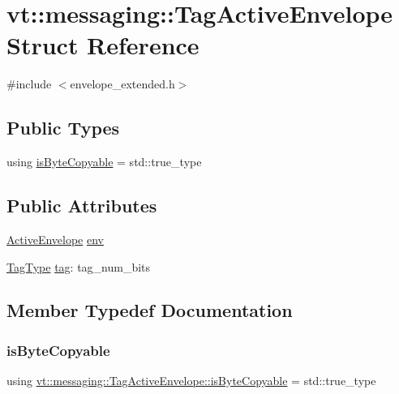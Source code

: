 \hypertarget{structvt_1_1messaging_1_1_tag_active_envelope}{}\section{vt\+:\+:messaging\+:\+:Tag\+Active\+Envelope Struct Reference}
\label{structvt_1_1messaging_1_1_tag_active_envelope}


{\ttfamily \#include $<$envelope\+\_\+extended.\+h$>$}

\subsection*{Public Types}
\begin{DoxyCompactItemize}
\item 
using \hyperlink{structvt_1_1messaging_1_1_tag_active_envelope_a25b95de57b90351e8b017ea2742eadc2}{is\+Byte\+Copyable} = std\+::true\+\_\+type
\end{DoxyCompactItemize}
\subsection*{Public Attributes}
\begin{DoxyCompactItemize}
\item 
\hyperlink{structvt_1_1messaging_1_1_active_envelope}{Active\+Envelope} \hyperlink{structvt_1_1messaging_1_1_tag_active_envelope_a407d7bb06664c813df052dac889f8f3a}{env}
\item 
\hyperlink{namespacevt_a84ab281dae04a52a4b243d6bf62d0e52}{Tag\+Type} \hyperlink{structvt_1_1messaging_1_1_tag_active_envelope_ab5fdfcb898f8e0ca0b5c580018824766}{tag}\+: tag\+\_\+num\+\_\+bits
\end{DoxyCompactItemize}


\subsection{Member Typedef Documentation}
\mbox{\label{structvt_1_1messaging_1_1_tag_active_envelope_a25b95de57b90351e8b017ea2742eadc2}} 
\subsubsection{\texorpdfstring{is\+Byte\+Copyable}{isByteCopyable}}
{\footnotesize\ttfamily using \hyperlink{structvt_1_1messaging_1_1_tag_active_envelope_a25b95de57b90351e8b017ea2742eadc2}{vt\+::messaging\+::\+Tag\+Active\+Envelope\+::is\+Byte\+Copyable} =  std\+::true\+\_\+type}



